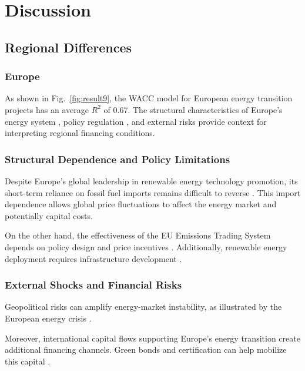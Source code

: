 \section{Discussion}
\label{sec:discussion}

\subsection{Regional Differences}

\subsubsection{Europe}

As shown in Fig.~\ref{fig:result9}, the WACC model for European energy transition projects has an average $R^2$ of 0.67. The structural characteristics of Europe's energy system \cite{ROMANCOLLADO2024108009}, policy regulation \cite{EUETS,RenewableEnergyDirective}, and external risks \cite{WEI2024110522} provide context for interpreting regional financing conditions.

\subsubsection{Structural Dependence and Policy Limitations}

Despite Europe's global leadership in renewable energy technology promotion, its short-term reliance on fossil fuel imports remains difficult to reverse \cite{LI20211712}. This import dependence allows global price fluctuations to affect the energy market and potentially capital costs.

On the other hand, the effectiveness of the EU Emissions Trading System depends on policy design and price incentives \cite{EUETS}. Additionally, renewable energy deployment requires infrastructure development \cite{RenewableEnergyDirective}.

\subsubsection{External Shocks and Financial Risks}

Geopolitical risks can amplify energy-market instability, as illustrated by the European energy crisis \cite{WEI2024110522}.

Moreover, international capital flows supporting Europe's energy transition create additional financing channels. Green bonds and certification can help mobilize this capital \cite{ehlers2017green,flammer2021corporate}.

